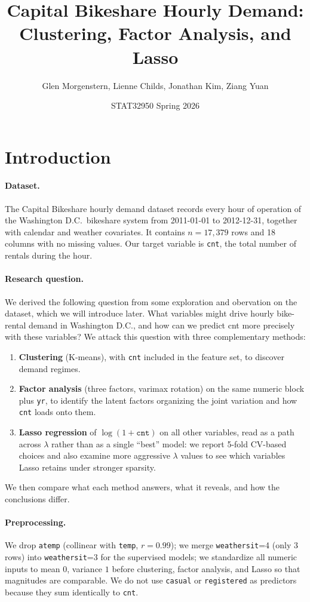 \documentclass[11pt]{article}
\title{Capital Bikeshare Hourly Demand:\\
       Clustering, Factor Analysis, and Lasso}
\author{Glen Morgenstern, Lienne Childs, Jonathan Kim, Ziang Yuan}
\date{STAT32950 Spring 2026}
\begin{document}
\maketitle

\section{Introduction}

\paragraph{Dataset.}
The Capital Bikeshare hourly demand dataset records every hour of operation of the Washington D.C.\ bikeshare
system from 2011-01-01 to 2012-12-31, together with calendar and weather covariates. It contains $n=17{,}379$ rows and 18 columns with no missing values. Our target variable is \texttt{cnt}, the total number of rentals during the hour.

\paragraph{Research question.}
We derived the following question from some exploration and obervation on the dataset, which we will introduce later. What variables might drive hourly bike-rental demand in Washington D.C., and how can we predict cnt more precisely with these variables?
We attack this question with three complementary methods:
\begin{enumerate}
\item \textbf{Clustering} (K-means), with \texttt{cnt} included in the
      feature set, to discover demand regimes.
\item \textbf{Factor analysis} (three factors, varimax rotation) on
      the same numeric block plus \texttt{yr}, to identify the
      latent factors organizing the joint variation and how
      \texttt{cnt} loads onto them.
\item \textbf{Lasso regression} of $\log(1+\texttt{cnt})$ on all
      other variables, read as a path across $\lambda$ rather than as a single ``best'' model: we report 5-fold CV-based choices and also examine more aggressive $\lambda$ values to see which variables Lasso retains under stronger sparsity.
\end{enumerate}
We then compare what each method answers, what it reveals, and how
the conclusions differ.

\paragraph{Preprocessing.}
We drop \texttt{atemp} (collinear with \texttt{temp}, $r=0.99$); we
merge \texttt{weathersit}=4 (only $3$ rows) into \texttt{weathersit}=3
for the supervised models; we standardize all numeric inputs to
mean $0$, variance $1$ before clustering, factor analysis, and
Lasso so that magnitudes are comparable. We do not use
\texttt{casual} or \texttt{registered} as predictors because they
sum identically to \texttt{cnt}.
\end{document}
